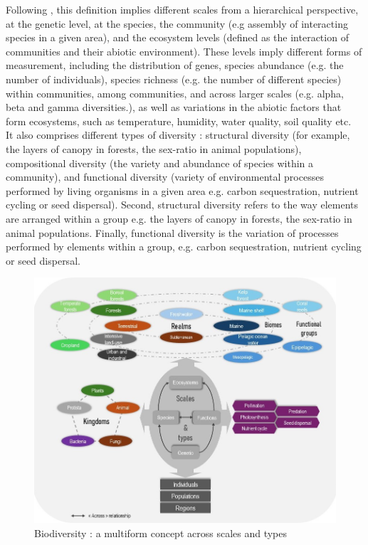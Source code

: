 Following \cite{mouysset_diversity_2023}, this definition implies different scales from a hierarchical perspective, at the genetic level, at the species, the community (e.g assembly of interacting species in a given area), and the ecosystem levels (defined as the interaction of communities and their abiotic environment). These levels imply different forms of measurement, including the distribution of genes, species abundance (e.g. the number of individuals), species richness (e.g. the number of different species) within communities, among communities, and across larger scales (e.g. alpha, beta and gamma diversities.), as well as variations in the abiotic factors that form ecosystems, such as temperature, humidity, water quality, soil quality etc. 
\\
It also comprises different types of diversity : structural diversity (for example, the layers of canopy in forests, the sex-ratio in animal populations), compositional diversity (the variety and abundance of species within a community), and functional diversity (variety of environmental processes performed by living organisms in a given area e.g. carbon sequestration, nutrient cycling or seed dispersal). Second, structural diversity refers to the way elements are arranged within a group e.g. the layers of canopy in forests, the sex-ratio in animal populations. Finally, functional diversity is the variation of processes performed by elements within a group, e.g. carbon sequestration, nutrient cycling or seed dispersal.

\begin{figure}
	\centering
	\includegraphics[width =.8\textwidth]{figures/intro/biodiv_illustration.jpg}
	\caption{Biodiversity : a multiform concept across scales and types}
	\label{fig:intro_biod}
\end{figure}

